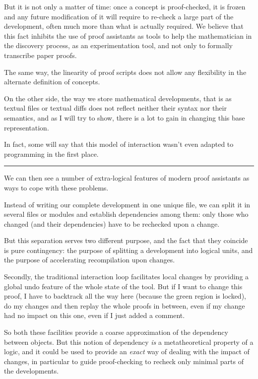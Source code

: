 \documentclass[12pt]{article}
\newcommand{\slide}{\vspace{1em} \hrule \vspace{1em}}
\begin{document}
But it is not only a matter of time: once a concept is proof-checked,
it is frozen and any future modification of it will require to
re-check a large part of the development, often much more than what is
actually required. We believe that this fact inhibits the use of proof
assistants as tools to help the mathematician in the discovery
process, as an experimentation tool, and not only to formally
transcribe paper proofs.

The same way, the linearity of proof scripts does not allow any
flexibility in the alternate definition of concepts.

On the other side, the way we store mathematical developments, that is
as textual files or textual diffs does not reflect neither their
syntax nor their semantics, and as I will try to show, there is a lot
to gain in changing this base representation.

In fact, some will say that this model of interaction wasn't even
adapted to programming in the first place.

\slide

We can then see a number of extra-logical features of modern proof
assistants as ways to cope with these problems. 

Instead of writing our complete development in one unique file, we can
split it in several files or modules and establish dependencies among
them: only those who changed (and their dependencies) have to be
rechecked upon a change.

But this separation serves two different purpose, and the fact that
they coincide is pure contingency: the purpose of splitting a
development into logical units, and the purpose of accelerating
recompilation upon changes.

Secondly, the traditional interaction loop facilitates local changes
by providing a global undo feature of the whole state of the tool. But
if I want to change this proof, I have to backtrack all the way here
(because the green region is locked), do my changes and then replay
the whole proofs in between, even if my change had no impact on this
one, even if I just added a comment.

So both these facilities provide a coarse approximation of the
dependency between objects. But this notion of dependency \emph{is} a
metatheoretical property of a logic, and it could be used to provide
an \emph{exact} way of dealing with the impact of changes, in
particular to guide proof-checking to recheck only minimal parts of
the developments.
\end{document}
